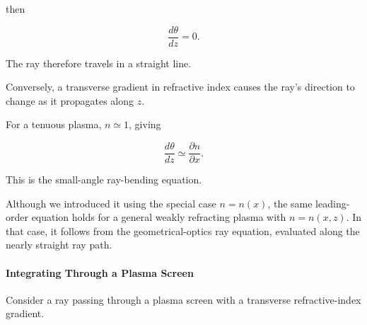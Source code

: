 then

\begin{equation}
\frac{d\theta}{dz}=0.
\end{equation}

The ray therefore travels in a straight line.

Conversely, a transverse gradient in refractive
index causes the ray's direction to change
as it propagates along $z$.

For a tenuous plasma, $n\simeq 1$, giving

\begin{equation}
\boxed{
\frac{d\theta}{dz}
\simeq
\frac{\partial n}{\partial x}.
}
\end{equation}

This is the small-angle ray-bending equation.

Although we introduced it using the special
case $n=n(x)$, the same leading-order equation
holds for a general weakly refracting plasma
with $n=n(x,z)$. In that case, it follows
from the geometrical-optics ray equation,
evaluated along the nearly straight ray path.

\paragraph{Integrating Through a Plasma Screen}

Consider a ray passing through a plasma screen
with a transverse refractive-index gradient.

\begin{center}
\end{center}

